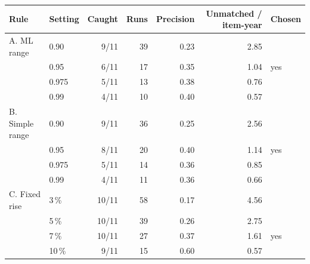 \begin{tabular}{llrrrrl}
\toprule
\textbf{Rule} & \textbf{Setting} & \textbf{Caught} & \textbf{Runs} & \textbf{Precision} & \textbf{Unmatched / item-year} & \textbf{Chosen} \\
\midrule
A. ML range & 0.90 & 9/11 & 39 & 0.23 & 2.85 & \\
 & 0.95 & 6/11 & 17 & 0.35 & 1.04 & yes \\
 & 0.975 & 5/11 & 13 & 0.38 & 0.76 & \\
 & 0.99 & 4/11 & 10 & 0.40 & 0.57 & \\
\midrule
B. Simple range & 0.90 & 9/11 & 36 & 0.25 & 2.56 & \\
 & 0.95 & 8/11 & 20 & 0.40 & 1.14 & yes \\
 & 0.975 & 5/11 & 14 & 0.36 & 0.85 & \\
 & 0.99 & 4/11 & 11 & 0.36 & 0.66 & \\
\midrule
C. Fixed rise & 3\,\% & 10/11 & 58 & 0.17 & 4.56 & \\
 & 5\,\% & 10/11 & 39 & 0.26 & 2.75 & \\
 & 7\,\% & 10/11 & 27 & 0.37 & 1.61 & yes \\
 & 10\,\% & 9/11 & 15 & 0.60 & 0.57 & \\
\bottomrule
\end{tabular}

